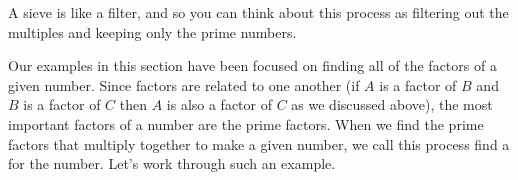 \documentclass{ximera}
\begin{document}
\begin{example}
\begin{image}
\end{image}
A sieve is like a filter, and so you can think about this process as filtering out the multiples and keeping only the prime numbers. 
\end{example}

Our examples in this section have been focused on finding all of the factors of a given number. Since factors are related to one another (if $A$ is a factor of $B$ and $B$ is a factor of $C$ then $A$ is also a factor of $C$ as we discussed above), the most important factors of a number are the prime factors. When we find the prime factors that multiply together to make a given number, we call this process find a   for the number. Let's work through such an example.
\end{document}
